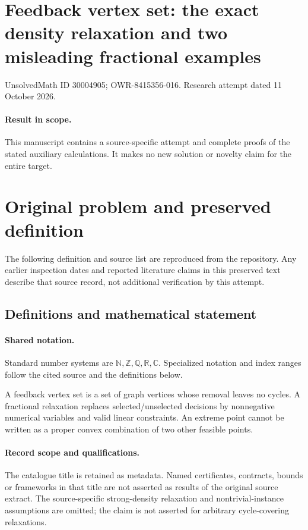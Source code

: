 \documentclass[11pt]{article}
\begin{document}
\section*{Feedback vertex set: the exact density relaxation and two misleading fractional examples}
\noindent UnsolvedMath ID 30004905; OWR-8415356-016. Research attempt dated 11 October 2026.
\paragraph{Result in scope.}This manuscript contains a source-specific attempt and complete proofs of the stated auxiliary calculations. It makes no new solution or novelty claim for the entire target.
\section{Original problem and preserved definition}
The following definition and source list are reproduced from the repository. Any earlier inspection dates and reported literature claims in this preserved text describe that source record, not additional verification by this attempt.
\subsection{Definitions and mathematical statement}

\paragraph{Shared notation.}Standard number systems are $\mathbb N,\mathbb Z,\mathbb Q,\mathbb R,\mathbb C$. Specialized notation and index ranges follow the cited source and the definitions below.


A feedback vertex set is a set of graph vertices whose removal leaves no cycles. A fractional relaxation replaces selected/unselected decisions by nonnegative numerical variables and valid linear constraints. An extreme point cannot be written as a proper convex combination of two other feasible points.
\paragraph{Record scope and qualifications.}
The catalogue title is retained as metadata. Named certificates, contracts, bounds or frameworks in that title are not asserted as results of the original source extract.
The source-specific strong-density relaxation and nontrivial-instance assumptions are omitted; the claim is not asserted for arbitrary cycle-covering relaxations.
\end{document}
